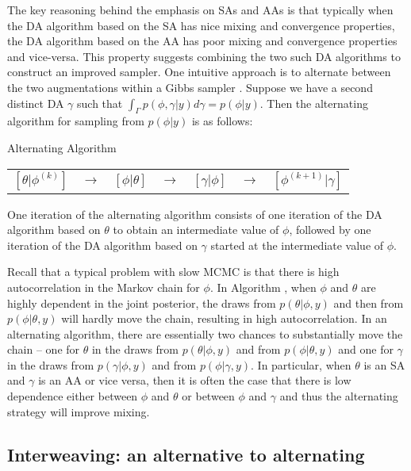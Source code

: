 \documentclass[12pt]{article}
\begin{document}
The key reasoning behind the emphasis on SAs and AAs is that typically when the DA algorithm based on the SA has nice mixing and convergence properties, the DA algorithm based on the AA has poor mixing and convergence properties and vice-versa. This property suggests combining the two such DA algorithms to construct an improved sampler. One intuitive approach is to alternate between the two augmentations within a Gibbs sampler \citep{papaspiliopoulos2007general}. Suppose we have a second distinct DA $\gamma$ such that $\int_\Gamma p(\phi,\gamma|y)d\gamma = p(\phi|y)$. Then the alternating algorithm for sampling from $p(\phi|y)$ is as follows:
\begin{alg*}[Alt]Alternating Algorithm\label{alg:Alt}
  \begin{center}
    \begin{tabular}{lllllll}
  $[\theta|\phi^{(k)}]$& $\to$& $[\phi|\theta]$& $\to$& $[\gamma|\phi]$& $\to$& $[\phi^{(k+1)}|\gamma]$
    \end{tabular}
  \end{center}
\end{alg*}
\noindent One iteration of the alternating algorithm consists of one iteration of the DA algorithm based on $\theta$ to obtain an intermediate value of $\phi$, followed by one iteration of the DA algorithm based on $\gamma$ started at the intermediate value of $\phi$.

Recall that a typical problem with slow MCMC is that there is high autocorrelation in the Markov chain for $\phi$. In Algorithm , when $\phi$ and $\theta$ are highly dependent in the joint posterior, the draws from $p(\theta|\phi,y)$ and then from $p(\phi|\theta,y)$ will hardly move the chain, resulting in high autocorrelation. In an alternating algorithm, there are essentially two chances to substantially move the chain -- one for $\theta$ in the draws from $p(\theta|\phi,y)$ and from $p(\phi|\theta,y)$ and one for $\gamma$ in the draws from $p(\gamma|\phi,y)$ and from $p(\phi|\gamma,y)$.  In particular, when $\theta$ is an SA and $\gamma$ is an AA or vice versa, then it is often the case that there is low dependence either between $\phi$ and $\theta$ or between $\phi$ and $\gamma$ and thus the alternating strategy will improve mixing.

\subsection{Interweaving: an alternative to alternating}\label{sec:Intro:int}
\end{document}
